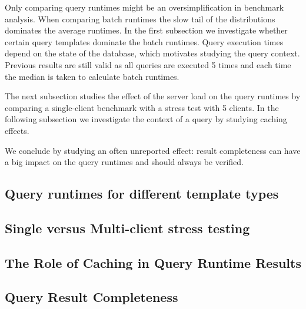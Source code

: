 Only comparing query runtimes might be an oversimplification in benchmark analysis. 
When comparing batch runtimes the slow tail of the distributions dominates the average runtimes. In the first subsection
we investigate whether certain query templates dominate the batch runtimes.
Query execution times depend on the state of the database, which motivates studying the query context. Previous results are still valid as all queries are executed 5 times and each time the median is taken to calculate batch runtimes.

The next subsection
studies the effect of the server load on the query runtimes by comparing a single-client benchmark with a stress test with 5 clients. In the following subsection we investigate the context of a query by studying caching effects. 

We conclude by studying an often unreported effect: result completeness can have a big impact on the query runtimes and should always be verified.

\subsection{Query runtimes for different template types}
\label{subsec:templates}


\subsection{Single versus Multi-client stress testing}
\label{subsec:load}


\subsection{The Role of Caching in Query Runtime Results}
\label{subsec:caching}






\subsection{Query Result Completeness}
\label{subsec:completeness}
